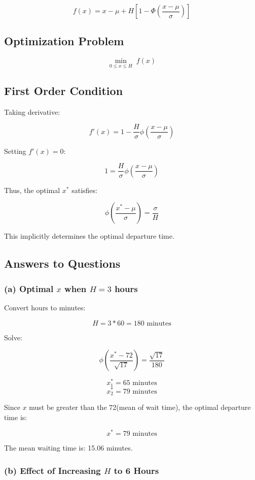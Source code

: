 \documentclass{KPS_assignment}
\begin{document}
\[
f(x)
=
x - \mu
+
H \left[
1 - \Phi\left(\frac{x-\mu}{\sigma}\right)
\right]
\]

\subsection*{Optimization Problem}

\[
\min_{0 \le x \le H}
\;
f(x)
\]

\subsection*{First Order Condition}

Taking derivative:

\[
f'(x)
=
1
-
\frac{H}{\sigma}
\phi\left(\frac{x-\mu}{\sigma}\right)
\]

Setting $f'(x)=0$:

\[
1
=
\frac{H}{\sigma}
\phi\left(\frac{x-\mu}{\sigma}\right)
\]

Thus, the optimal $x^*$ satisfies:

\[
\phi\left(\frac{x^*-\mu}{\sigma}\right)
=
\frac{\sigma}{H}
\]

This implicitly determines the optimal departure time.

\subsection*{Answers to Questions}

\subsubsection*{(a) Optimal $x$ when $H = 3$ hours}

Convert hours to minutes:

\[
H = 3*60 = 180 \text{ minutes}
\]

Solve:

\[
\phi\left(\frac{x^*-72}{\sqrt{17}}\right)
=
\frac{\sqrt{17}}{180}
\]

\[
x_1^* = 65 \text{ minutes}
\]
\[
x_2^* = 79 \text{ minutes}
\]

Since $x$ must be greater than the 72(mean of wait time), the optimal departure time is:

\[
x^* = 79 \text{ minutes}
\]

The mean waiting time is: 15.06 minutes.

\subsubsection*{(b) Effect of Increasing $H$ to 6 Hours}
\end{document}
